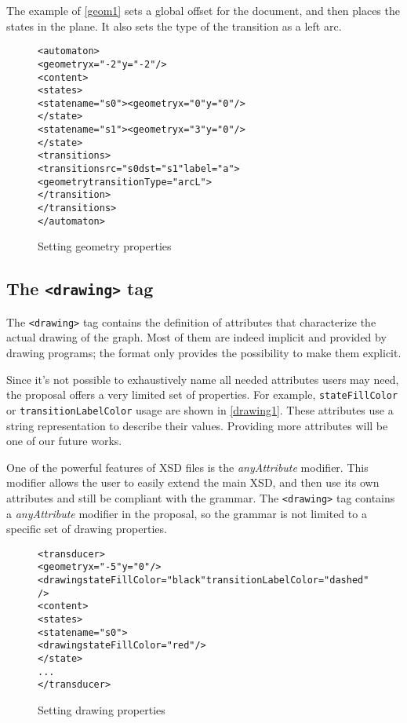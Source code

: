 \documentclass[a4paper]{article}
\newcommand{\xtag}[1]{\texttt{<#1>}}
\newcommand{\xattr}[1]{\texttt{#1}}
\begin{document}
The example of \autoref{geom1} sets a global offset for the document,
and then places the states in the plane.  It also sets the type of the
transition as a left arc.

\begin{figure}[htp]
  \small
  \begin{center}
\begin{alltt}
<automaton>
  <geometry x="-2" y="-2"/>
  <content>
     <states>
        <state name="s0"><geometry x="0" y="0"/>
        </state>
        <state name="s1"><geometry x="3" y="0"/>
        </state>
     <transitions>
        <transition \xattr{src}="s0 \xattr{dst}="s1" label="a">
          <geometry transitionType="arcL">
        </transition>
     </transitions>
</automaton>
\end{alltt}

\caption{Setting geometry properties}
\label{geom1}
  \end{center}
\end{figure}


\subsection{The \xtag{drawing} tag}

The \xtag{drawing} tag contains the definition of attributes that
characterize the actual drawing of the graph.  Most of them are indeed
implicit and provided by drawing programs; the format only provides
the possibility to make them explicit.

Since it's not possible to exhaustively name all needed attributes
users may need, the proposal offers a very limited set of properties. For
example, \xattr{stateFillColor} or \xattr{transitionLabelColor} usage are
shown in \autoref{drawing1}. These attributes use a string representation to
describe their values. Providing more attributes will be one of our future
works.

One of the powerful features of XSD files is the \textit{anyAttribute}
modifier. This modifier allows the user to easily extend the main XSD,
and then use its own attributes and still be compliant with the
grammar. The \xtag{drawing} tag contains a \textit{anyAttribute}
modifier in the proposal, so the grammar is not limited to a specific
set of drawing properties.

\begin{figure}[ht]
  \small
  \begin{center}
\begin{alltt}
<transducer>
  <geometry x="-5" y="0"/>
  <drawing stateFillColor="black" transitionLabelColor="dashed"/>
  <content>
     <states>
        <state name="s0">
            <drawing stateFillColor="red"/>
        </state>
      ...
</transducer>
\end{alltt}

\caption{Setting drawing properties}
\label{drawing1}
  \end{center}
\end{figure}
\end{document}
